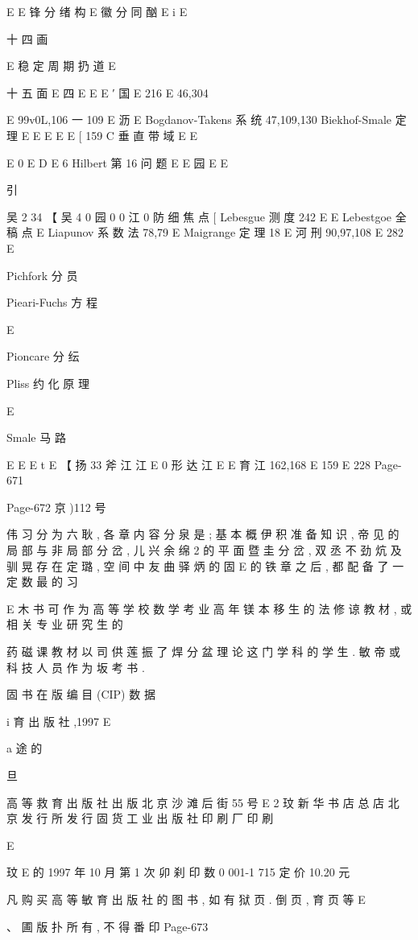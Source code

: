 E E
锋 分 绪 构 E
徽 分 同 酗 E
i E

十 四 画

E
稳 定 周 期 扔 道
E

十 五 面
E 四
E E
E ′ 国
E 216
E 46,304

E 99v0L,106 一 109
E 沥 E
Bogdanov-Takens 系 统 47,109,130
Biekhof-Smale 定 理 E
E E
E E
[ 159
C 垂 直 带 域 E
E

E 0
E D
E 6
Hilbert 第 16 问 题 E
E 园
E E

引

吴 2 34
【 吴 4
0 园
0 0
江 0
防 细 焦 点 [
Lebesgue 测 度 242
E E
Lebestgoe 全 稿 点 E
Liapunov 系 数 法 78,79
E
Maigrange 定 理 18
E 河 刑 90,97,108
E 282
E

Pichfork 分 员

Pieari-Fuchs 方 程

E

Pioncare 分 纭

Pliss 约 化 原 理

E

Smale 马 路

E E
E t E
【 扬 33 斧 江 江 E
0 形 达 江 E
E 育 江 162,168
E 159
E 228
Page-671

Page-672
京 )112 号

伟 习 分 为 六 耿 , 各 章 内 容 分 泉 是 ; 基 本 概 伊 积 准 备 知 识 , 帝 见 的 局 部 与 非 局 部 分
岔 , 儿 兴 余 绵 2 的 平 面 暨 圭 分 岔 , 双 丞 不 劲 炕 及 驯 晃 存 在 定 璐 , 空 间 中 友 曲 驿 炳 的 固
E 的 铁 章 之 后 , 都 配 备 了 一 定 数 最 的 习

E
木 书 可 作 为 高 等 学 校 数 学 考 业 高 年 镁 本 移 生 的 法 修 谅 教 材 , 或 相 关 专 业 研 究 生 的

药 磁 课 教 材 以 司 供 莲 振 了 焊 分 盆 理 论 这 门 学 科 的 学 生 . 敏 帝 或 科 技 人 员 作 为 坂 考 书 .

固 书 在 版 编 目 (CIP) 数 据

i
育 出 版 社 ,1997
E

a 途 的

旦

高 等 救 育 出 版 社 出 版
北 京 沙 滩 后 街 55 号
E 2 玟
新 华 书 店 总 店 北 京 发 行 所 发 行
固 货 工 业 出 版 社 印 刷 厂 印 刷

E

玟
E 的 1997 年 10 月 第 1 次 卯 刹
印 数 0 001-1 715
定 价 10.20 元

凡 购 买 高 等 敏 育 出 版 社 的 图 书 , 如 有 狱 页 . 倒 页 , 育 页 等
E

、 圃 版 扑 所 有 , 不 得 番 印
Page-673

